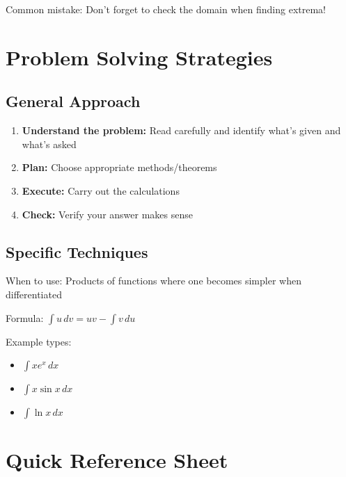 \documentclass[11pt,a4paper]{article}
\begin{document}
\begin{warning}
    Common mistake: Don't forget to check the domain when finding extrema!
\end{warning}

\section{Problem Solving Strategies}

\subsection{General Approach}
\begin{enumerate}
    \item \textbf{Understand the problem:} Read carefully and identify what's given and what's asked
    \item \textbf{Plan:} Choose appropriate methods/theorems
    \item \textbf{Execute:} Carry out the calculations
    \item \textbf{Check:} Verify your answer makes sense
\end{enumerate}

\subsection{Specific Techniques}
\begin{reviewbox}
    When to use: Products of functions where one becomes simpler when differentiated
    
    Formula: $\int u\,dv = uv - \int v\,du$
    
    Example types:
    \begin{itemize}
        \item $\int x e^x\,dx$
        \item $\int x \sin x\,dx$
        \item $\int \ln x\,dx$
    \end{itemize}
\end{reviewbox}

\section{Quick Reference Sheet}
\end{document}
